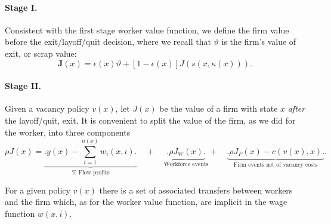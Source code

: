 \paragraph{Stage I.}
Consistent with the first stage worker value function, we define the firm
value before the exit/layoff/quit decision, where we recall that $\vartheta$ is the firm's value of exit, or scrap value:
\begin{equation*}
\bm{J}\left( x\right) =\epsilon \left( x\right)\vartheta + \left[
1-\epsilon \left( x\right) \right] J\left( s\left( x,\kappa \left( x\right)
\right) \right).
\end{equation*}%

\paragraph{Stage II.}
Given a vacancy policy $v\left( x\right)$, let $J\left( x\right)$ be the
value of a firm with state $x$ \emph{after} the layoff/quit, exit. It is
convenient to split the value of the firm, as we did for the
worker, into three components
\begin{equation*}
\rho J\left( x\right) = \underbrace{\Bigg.y\left( x\right)
-\sum\limits_{i=1}^{n\left( x\right)}w_{i}\left( x,i\right)\Bigg.}_{\text{%
Flow profits}} \quad+\quad \underbrace{\Bigg.\rho J_{W}\left( x\right)\Bigg.}%
_{\text{Workforce events}} +\quad \underbrace{\Bigg.\rho J_{F}\left(
x\right)-c\left( v\left( x\right) ,x\right)\Bigg.}_{\text{Firm events net of
vacancy costs}}.
\end{equation*}%

For a given policy $v(x)$ there is a set of associated transfers between workers and the firm which, as for the worker value function, are implicit in the wage function $w(x,i)$.


